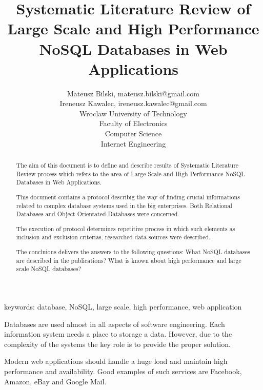 \documentclass[times, 10pt,twocolumn]{article}
\begin{document}
  

\title{ Systematic Literature Review of Large Scale and High Performance NoSQL Databases in Web Applications}
\author{Mateusz Bilski, mateusz.bilski@gmail.com \\ Ireneusz Kawalec, ireneusz.kawalec@gmail.com \\ 
Wroclaw University of Technology\\ Faculty of Electronics \\ Computer Science \\ Internet Engineering  \\  
}

\maketitle
\thispagestyle{empty} 

\begin{abstract}  

The aim of this document is to define and describe results of Systematic Literature Review process which 
refers to the area of Large Scale and High Performance NoSQL Databases in Web Applications.

This document contains a protocol describig the way of finding crucial informations related to complex database systems used in the big enterprises.   
Both Relational Databases and Object Orientated Databases were concerned.

The execution of protocol determines repetitive process in which such elements as  
inclusion and exclusion criterias, researched data sources were described. 

The concluions delivers the answers to the following questions:
What NoSQL databases are described in the publications? What is known about high performance and large scale NoSQL databases?

\end{abstract} 

keywords: database, NoSQL, large scale, high performance, web application


Databases are used almost in all aspects of software engineering. Each 
information system needs a place to storage a data. However, due to the complexity of the systems 
the key role is to provide the proper solution.

Modern web applications should handle a huge load and maintain high performance and
availability. Good examples of such services are Facebook, Amazon, eBay and Google Mail.
\end{document}
